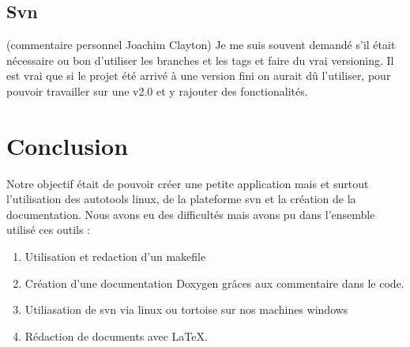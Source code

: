\documentclass[a4paper 12pts]{article}
\begin{document}
\subsection{Svn}

(commentaire personnel Joachim Clayton) 
Je me suis souvent demandé s'il était nécessaire ou bon d'utiliser les branches et les tags et faire du vrai versioning. 
Il est vrai que si le projet été arrivé à une version fini on aurait dû l'utiliser, pour pouvoir travailler sur une v2.0 et y rajouter des fonctionalités.



\section{Conclusion}

Notre objectif était de pouvoir créer une petite application mais et surtout l'utilisation des autotools linux, de la plateforme svn et la création de la documentation.
Nous avons eu des difficultés mais avons pu dans l'ensemble utilisé ces outils : 

\begin{enumerate}
\item Utilisation et redaction d'un makefile 
\item Création d'une documentation Doxygen grâces aux commentaire dans le code.
\item Utiliasation de svn via linux ou tortoise sur nos machines windows
\item Rédaction de documents avec \LaTeX.
\end{enumerate}
\end{document}
